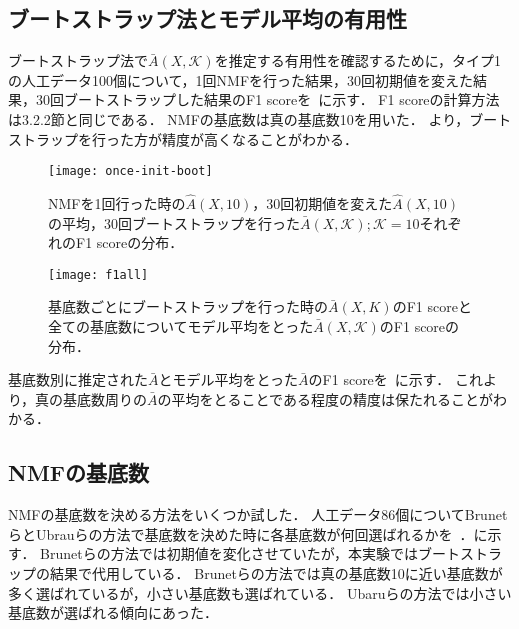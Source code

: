 \subsection{ブートストラップ法とモデル平均の有用性}
ブートストラップ法で$\bar{A}(X,\mathcal{K})$を推定する有用性を確認するために，タイプ1の人工データ100個について，1回NMFを行った結果，30回初期値を変えた結果，30回ブートストラップした結果のF1 scoreを~に示す．
F1 scoreの計算方法は3.2.2節と同じである．
NMFの基底数は真の基底数10を用いた．
より，ブートストラップを行った方が精度が高くなることがわかる．

\begin{figure}[htbp]
    \begin{minipage}{0.5\hsize}
			\begin{center}
					\texttt{[image: once-init-boot]}
					\caption{NMFを1回行った時の$\hat{A}(X,10)$，30回初期値を変えた$\hat{A}(X,10)$の平均，30回ブートストラップを行った$\bar{A}(X,\mathcal{K}); \mathcal{K} = {10}$それぞれのF1 scoreの分布．}
					\label{fig:once-init-boot}
			\end{center}
		\end{minipage}
    \begin{minipage}{0.5\hsize}
			\begin{center}
					\texttt{[image: f1all]}
					\caption{基底数ごとにブートストラップを行った時の$\bar{A}(X,{K})$のF1 scoreと全ての基底数についてモデル平均をとった$\bar{A}(X,\mathcal{K})$のF1 scoreの分布．}
					\label{fig:f1all}
			\end{center}
		\end{minipage}
\end{figure}

基底数別に推定された$\bar{A}$とモデル平均をとった$\bar{A}$のF1 scoreを~に示す．
これより，真の基底数周りの$\bar{A}$の平均をとることである程度の精度は保たれることがわかる．

\subsection{NMFの基底数}
NMFの基底数を決める方法をいくつか試した．
人工データ86個についてBrunetらとUbrauらの方法で基底数を決めた時に各基底数が何回選ばれるかを~．に示す．
Brunetらの方法では初期値を変化させていたが，本実験ではブートストラップの結果で代用している．
Brunetらの方法では真の基底数10に近い基底数が多く選ばれているが，小さい基底数も選ばれている．
Ubaruらの方法では小さい基底数が選ばれる傾向にあった．

